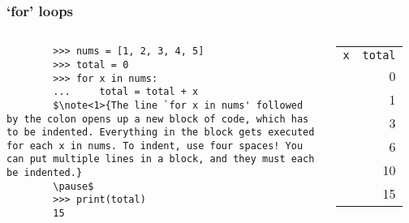 \documentclass[notes]{beamer}
\begin{document}
\begin{frame}[fragile]
	\frametitle{`for' loops}
	
	\begin{columns}[c]
		\begin{lstlisting}
		>>> nums = [1, 2, 3, 4, 5]
		>>> total = 0
		>>> for x in nums:
		...     total = total + x
		$\note<1>{The line `for x in nums' followed by the colon opens up a new block of code, which has to be indented. Everything in the block gets executed for each x in nums. To indent, use four spaces! You can put multiple lines in a block, and they must each be indented.}
		\pause$
		>>> print(total)
		15
		\end{lstlisting}
		
		\pause
		\begin{tabular}{l | r}
			\lstinline|x| & \lstinline|total| \\
			\, & 0 \\ \pause
			1 & 1 \\ \pause
			2 & 3 \\ \pause
			3 & 6 \\ \pause
			4 & 10 \\ \pause
			5 & 15 \\
		\end{tabular}
	\end{columns}
	
	
\end{frame}
\end{document}
